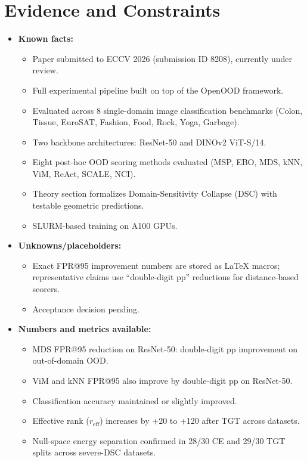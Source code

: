 \documentclass{article}
\begin{document}
\section*{Evidence and Constraints}
\begin{itemize}
    \item \textbf{Known facts:}
    \begin{itemize}
        \item Paper submitted to ECCV 2026 (submission ID 8208), currently under review.
        \item Full experimental pipeline built on top of the OpenOOD framework.
        \item Evaluated across 8 single-domain image classification benchmarks (Colon, Tissue, EuroSAT, Fashion, Food, Rock, Yoga, Garbage).
        \item Two backbone architectures: ResNet-50 and DINOv2 ViT-S/14.
        \item Eight post-hoc OOD scoring methods evaluated (MSP, EBO, MDS, kNN, ViM, ReAct, SCALE, NCI).
        \item Theory section formalizes Domain-Sensitivity Collapse (DSC) with testable geometric predictions.
        \item SLURM-based training on A100 GPUs.
    \end{itemize}
    \item \textbf{Unknowns/placeholders:}
    \begin{itemize}
        \item Exact FPR@95 improvement numbers are stored as LaTeX macros; representative claims use ``double-digit pp'' reductions for distance-based scorers.
        \item Acceptance decision pending.
    \end{itemize}
    \item \textbf{Numbers and metrics available:}
    \begin{itemize}
        \item MDS FPR@95 reduction on ResNet-50: double-digit pp improvement on out-of-domain OOD.
        \item ViM and kNN FPR@95 also improve by double-digit pp on ResNet-50.
        \item Classification accuracy maintained or slightly improved.
        \item Effective rank ($r_{\mathrm{eff}}$) increases by +20 to +120 after TGT across datasets.
        \item Null-space energy separation confirmed in 28/30 CE and 29/30 TGT splits across severe-DSC datasets.

\end{itemize}
\end{itemize}
\end{document}
